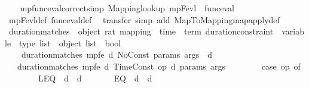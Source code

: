 \begin{isabellebody}
\isanewline
\ \ \isamarkupfalse%
\ mp{\isacharunderscore}{\kern0pt}func{\isacharunderscore}{\kern0pt}eval{\isacharunderscore}{\kern0pt}correct{\isacharbrackleft}{\kern0pt}simp{\isacharbrackright}{\kern0pt}{\isacharcolon}{\kern0pt}\ {\isachardoublequoteopen}Mapping{\isachardot}{\kern0pt}lookup\ mp{\isacharunderscore}{\kern0pt}Fevl\ {\isacharequal}{\kern0pt}\ func{\isacharunderscore}{\kern0pt}eval{\isachardoublequoteclose}\isanewline
%
\isadelimproof
\ \ \ \ %
\endisadelimproof
%
\isatagproof
{}\isamarkupfalse%
\ mp{\isacharunderscore}{\kern0pt}Fevl{\isacharunderscore}{\kern0pt}def\ func{\isacharunderscore}{\kern0pt}eval{\isacharunderscore}{\kern0pt}def\ \isamarkupfalse%
\ transfer\ {\isacharparenleft}{\kern0pt}simp\ add{\isacharcolon}{\kern0pt}\ Map{\isacharunderscore}{\kern0pt}To{\isacharunderscore}{\kern0pt}Mapping{\isachardot}{\kern0pt}map{\isacharunderscore}{\kern0pt}apply{\isacharunderscore}{\kern0pt}def{\isacharparenright}{\kern0pt}%
\endisatagproof
{\isafoldproof}%
%
\isadelimproof
\isanewline
%
\endisadelimproof
\isanewline
\ \ \isamarkupfalse%
\ duration{\isacharunderscore}{\kern0pt}matches{\isacharprime}{\kern0pt}\ {\isacharcolon}{\kern0pt}{\isacharcolon}{\kern0pt}\ {\isachardoublequoteopen}{\isacharparenleft}{\kern0pt}object{\isacharcomma}{\kern0pt}\ rat{\isacharparenright}{\kern0pt}\ mapping\ {\isasymRightarrow}\ time\ {\isasymRightarrow}\ term\ duration{\isacharunderscore}{\kern0pt}constraint\ {\isasymRightarrow}\ {\isacharparenleft}{\kern0pt}variable\ {\isasymtimes}\ type{\isacharparenright}{\kern0pt}\ list\ {\isasymRightarrow}\ object\ list\ {\isasymRightarrow}\ bool{\isachardoublequoteclose}\ \isanewline
\ \ \ \ {\isachardoublequoteopen}duration{\isacharunderscore}{\kern0pt}matches{\isacharprime}{\kern0pt}\ mp{\isacharunderscore}{\kern0pt}fe\ d\ No{\isacharunderscore}{\kern0pt}Const\ params\ args\ {\isasymlongleftrightarrow}\ d\ {\isasymge}\ {}{\isachardoublequoteclose}\isanewline
\ \ {\isacharbar}{\kern0pt}\ {\isachardoublequoteopen}duration{\isacharunderscore}{\kern0pt}matches{\isacharprime}{\kern0pt}\ mp{\isacharunderscore}{\kern0pt}fe\ d\ {\isacharparenleft}{\kern0pt}Time{\isacharunderscore}{\kern0pt}Const\ op\ d{\isacharprime}{\kern0pt}{\isacharparenright}{\kern0pt}\ params\ args\ {\isasymlongleftrightarrow}\ \isanewline
\ \ \ \ \ \ {\isacharparenleft}{\kern0pt}case\ op\ of\isanewline
\ \ \ \ \ \ \ \ LEQ\ {\isasymRightarrow}\ d\ {\isasymle}\ d{\isacharprime}{\kern0pt}\isanewline
\ \ \ \ \ \ {\isacharbar}{\kern0pt}\ EQ\ {\isasymRightarrow}\ d\ {\isacharequal}{\kern0pt}\ d{\isacharprime}{\kern0pt}\isanewline

\end{isabellebody}
